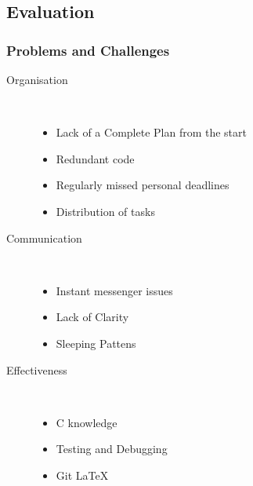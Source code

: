 \documentclass{beamer}
\begin{document}
\subsection{Evaluation}
\begin{frame}

\frametitle{Problems and Challenges}

\begin{description}

\item[Organisation]\hfill\\
	\begin{itemize}
	\item Lack of a Complete Plan from the start
	\item Redundant code
	\item Regularly missed personal deadlines
	\item Distribution of tasks
	\end{itemize}

\item[Communication]\hfill\\
	\begin{itemize}
	\item Instant messenger issues
	\item Lack of Clarity
	\item Sleeping Pattens
	\end{itemize}

\item[Effectiveness]\hfill\\
	\begin{itemize}
	\item C knowledge
	\item Testing and Debugging
	\item Git
	\LaTeX
	\end{itemize}


\end{description}
\end{frame}
\end{document}
